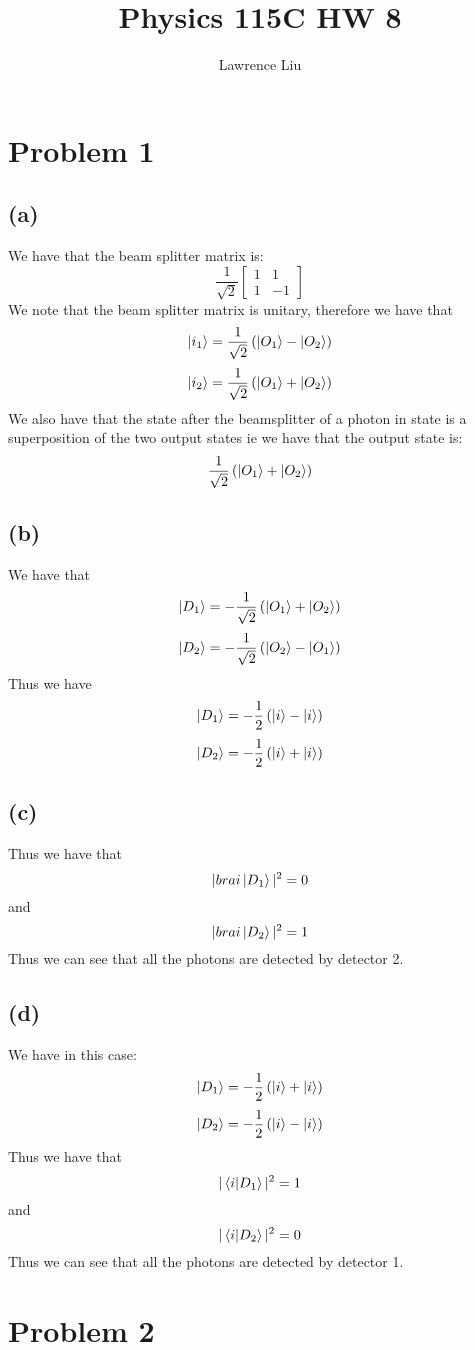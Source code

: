 \documentclass[11pt]{article}
\author{Lawrence Liu}
\title{Physics 115C HW 8}
\begin{document}
\maketitle
\section*{Problem 1}
\subsection*{(a)}
We have that the beam splitter matrix is:
$$
\frac{1}{\sqrt{2}}
\begin{bmatrix}
    1 & 1\\
    1 & -1
\end{bmatrix}$$
We note that the beam splitter matrix is unitary, therefore we have that
$$\ket{i_1} = \frac{1}{\sqrt{2}}\left(\ket{O_1}-\ket{O_2}\right)$$
$$\ket{i_2} = \frac{1}{\sqrt{2}}\left(\ket{O_1}+\ket{O_2}\right)$$
We also have that the state after the beamsplitter of a photon in state is 
a superposition of the two output states ie we have that the output state is:
$$\frac{1}{\sqrt{2}}\left(\ket{O_1}+\ket{O_2}\right)$$
\subsection*{(b)}
We have that 
$$\ket{D_1} = -\frac{1}{\sqrt{2}}\left(\ket{O_1}+\ket{O_2}\right)$$
$$\ket{D_2} = -\frac{1}{\sqrt{2}}\left(\ket{O_2}-\ket{O_1}\right)$$
Thus we have 
$$\ket{D_1} = -\frac{1}{2}\left(\ket{i}-\ket{i}\right)$$
$$\ket{D_2} = -\frac{1}{2}\left(\ket{i}+\ket{i}\right)$$
\subsection*{(c)}
Thus we have that 
$$|bra{i}\ket{D_1}|^2 = 0$$
and 
$$|bra{i}\ket{D_2}|^2 = 1$$
Thus we can see that all the photons are detected by detector 2.
\subsection*{(d)}
We have in this case:
$$\ket{D_1} = -\frac{1}{2}\left(\ket{i}+\ket{i}\right)$$
$$\ket{D_2} = -\frac{1}{2}\left(\ket{i}-\ket{i}\right)$$
Thus we have that
$$|\bra{i}\ket{D_1}|^2 = 1$$
and
$$|\bra{i}\ket{D_2}|^2 = 0$$
Thus we can see that all the photons are detected by detector 1.
\section*{Problem 2}
\end{document}
